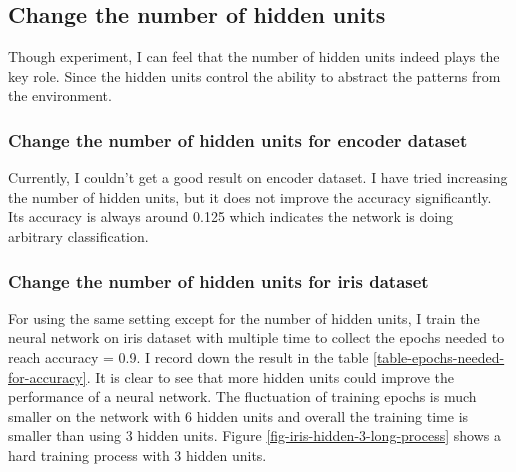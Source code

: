 \documentclass[11pt]{article}
\begin{document}
\subsection{Change the number of hidden units}
\label{sec-3-2}
Though experiment, I can feel that the number of hidden units indeed plays the key role. Since the hidden units control the ability to abstract the patterns from the environment.
\subsubsection{Change the number of hidden units for encoder dataset}
\label{sec-3-2-1}
Currently, I couldn't get a good result on encoder dataset. I have tried increasing the number of hidden units, but it does not improve the accuracy significantly. Its accuracy is always around 0.125 which indicates the network is doing arbitrary classification.


\subsubsection{Change the number of hidden units for iris dataset}
\label{sec-3-2-2}
For using the same setting except for the number of hidden units, I train the neural network on iris dataset with multiple time to collect the epochs needed to reach accuracy = 0.9. I record down the result in the table \ref{table-epochs-needed-for-accuracy}. It is clear to see that more hidden units could improve the performance of a neural network. The fluctuation of training epochs is much smaller on the network with 6 hidden units and overall the training time is smaller than using 3 hidden units. Figure \ref{fig-iris-hidden-3-long-process}  shows a hard training process with 3 hidden units.
\end{document}
